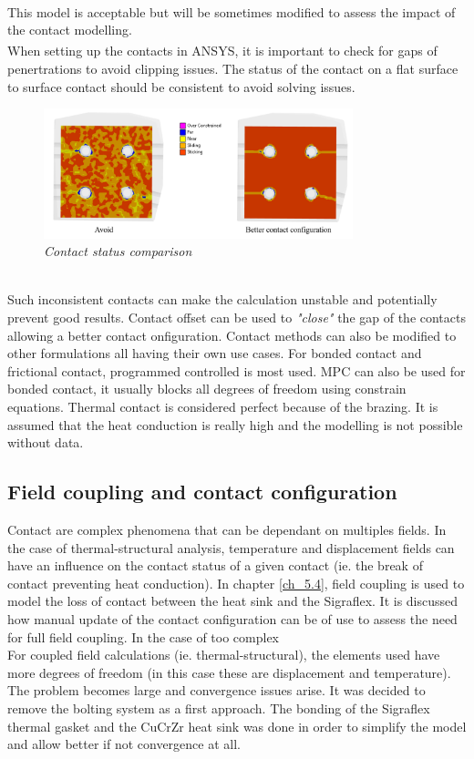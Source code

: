 \\
\break
\normalsize{This model is acceptable but will be sometimes modified to assess the impact of the contact modelling.}
\\
\break
\normalsize{\indent When setting up the contacts in ANSYS\textsuperscript{\textregistered}, it is important to check for gaps of penertrations to avoid clipping issues. The status of the contact on a flat surface to surface contact should be consistent to avoid solving issues.}
\begin{figure}[h!]
  \label{fig_4_1_0} 
  \centering
  \includegraphics[width=0.8\textwidth]{figures/wonrgvsrightcs.png}
  \caption{\it Contact status comparison}
\end{figure}
\\
\break
\normalsize{\indent Such inconsistent contacts can make the calculation unstable and potentially prevent good results. Contact offset can be used to {\it"close"} the gap of the contacts allowing a better contact onfiguration. Contact methods can also be modified to other formulations all having their own use cases. For bonded contact and frictional contact, programmed controlled is most used. MPC can also be used for bonded contact, it usually blocks all degrees of freedom using constrain equations. Thermal contact is considered perfect because of the brazing. It is assumed that the heat conduction is really high and the modelling is not possible without data.}
\subsection{Field coupling and contact configuration}
\normalsize{Contact are complex phenomena that can be dependant on multiples fields. In the case of thermal-structural analysis, temperature and displacement fields can have an influence on the contact status of a given contact (ie. the break of contact preventing heat conduction). In chapter \ref{ch_5.4}, field coupling is used to model the loss of contact between the heat sink and the Sigraflex. It is discussed how manual update of the contact configuration can be of use to assess the need for full field coupling. In the case of too complex }
\\
\break
\normalsize{\indent For coupled field calculations (ie. thermal-structural), the elements used have more degrees of freedom (in this case these are displacement and temperature). The problem becomes large and convergence issues arise. It was decided to remove the bolting system as a first approach. The bonding of the \acrshort{Sigraflex} thermal gasket and the \acrshort{CuCrZr} heat sink was done in order to simplify the model and allow better if not convergence at all.}